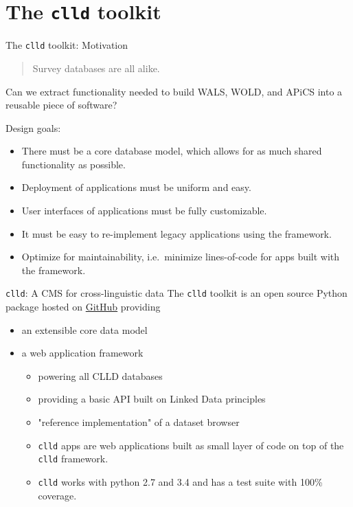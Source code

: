 \documentclass{beamer}
\begin{document}
\section{The \texttt{clld} toolkit}

\begin{frame}{The \texttt{clld} toolkit: Motivation}
\begin{quote}
Survey databases are all alike.
\end{quote}
Can we extract functionality needed to build WALS, WOLD, and APiCS into a reusable
piece of software?

Design goals:
\begin{itemize}
\item There must be a core database model, which allows for as much shared
functionality as possible.
\item Deployment of applications must be uniform and easy.
\item User interfaces of applications must be fully customizable.
\item It must be easy to re-implement legacy applications using the framework.
\item Optimize for maintainability, i.e.~minimize lines-of-code for apps built
with the framework.
\end{itemize}
\end{frame}


\begin{frame}{\texttt{clld}: A CMS for cross-linguistic data}
The \texttt{clld} toolkit is an open source Python package
hosted on \href{https://github.com/clld/clld}{GitHub}
providing
\begin{itemize}
\item an extensible core data model
\item a web application framework
\begin{itemize}
\item powering all CLLD databases
\item providing a basic API built on Linked Data principles
\item "reference implementation" of a dataset browser
\item \texttt{clld} apps are web applications built as small layer of code on top
of the \texttt{clld} framework.
\item \texttt{clld} works with python 2.7 and 3.4 and has a test suite with
100\% coverage.
\end{itemize}
\end{itemize}
\end{frame}
\end{document}

